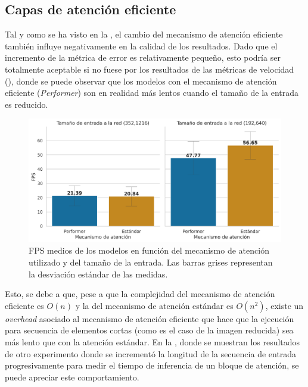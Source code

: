 \subsection{Capas de atención eficiente}\label{resultados-cuantitativos-atencion}
Tal y como se ha visto en la , el cambio del mecanismo de atención eficiente también influye negativamente en la calidad de los resultados. Dado que el incremento de la métrica de error es relativamente pequeño, esto podría ser totalmente aceptable si no fuese por los resultados de las métricas de velocidad (), donde se puede observar que los modelos con el mecanismo de atención eficiente (\textit{Performer}) son en realidad más lentos cuando el tamaño de la entrada es reducido.

\begin{figure}[H]
\centering
\includegraphics[width=0.9\linewidth]{imagenes/Resultados/velocidad_inferencia_mecanismo_atencion.png} 
\captionsetup{width=.9\linewidth}
\caption{FPS medios de los modelos en función del mecanismo de atención utilizado y del tamaño de la entrada. Las barras grises representan la desviación estándar de las medidas.}
\label{fig:resultados-inf-mec-atention}
\end{figure}

Esto, se debe a que, pese a que la complejidad del mecanismo de atención eficiente es $O(n)$ y la del mecanismo de atención estándar es $O(n^2)$, existe un \textit{overhead} asociado al mecanismo de atención eficiente que hace que la ejecución para secuencia de elementos cortas (como es el caso de la imagen reducida) sea más lento que con la atención estándar. En la , donde se muestran los resultados de otro experimento donde se incrementó la longitud de la secuencia de entrada progresivamente para medir el tiempo de inferencia de un bloque de atención, se puede apreciar este comportamiento.

